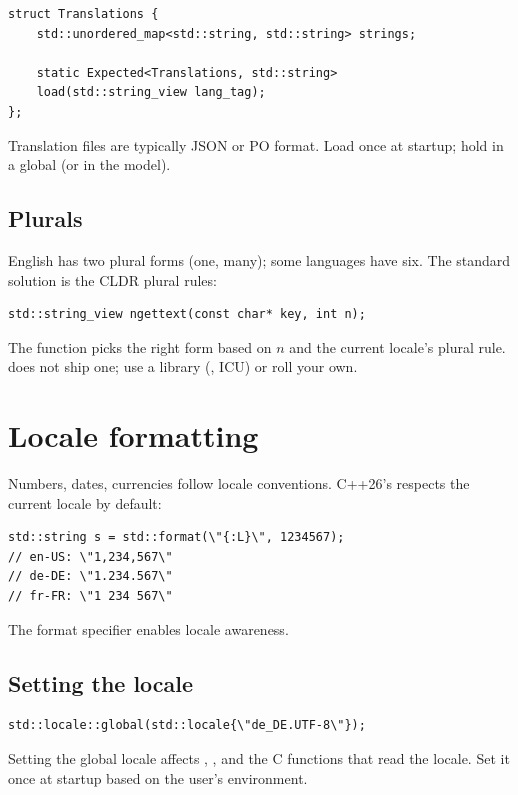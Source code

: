 \begin{lstlisting}
struct Translations {
    std::unordered_map<std::string, std::string> strings;

    static Expected<Translations, std::string>
    load(std::string_view lang_tag);
};
\end{lstlisting}

Translation files are typically JSON or PO format. Load once at
startup; hold in a global (or in the model).

\subsection*{Plurals}

English has two plural forms (one, many); some languages have
six. The standard solution is the CLDR plural rules:

\begin{lstlisting}
std::string_view ngettext(const char* key, int n);
\end{lstlisting}

The function picks the right form based on $n$ and the current
locale's plural rule. \maya{} does not ship one; use a library
(, ICU) or roll your own.

\section{Locale formatting}

Numbers, dates, currencies follow locale conventions. C++26's
 respects the current locale by default:

\begin{lstlisting}
std::string s = std::format(\"{:L}\", 1234567);
// en-US: \"1,234,567\"
// de-DE: \"1.234.567\"
// fr-FR: \"1 234 567\"
\end{lstlisting}

The  format specifier enables locale awareness.

\subsection*{Setting the locale}

\begin{lstlisting}
std::locale::global(std::locale{\"de_DE.UTF-8\"});
\end{lstlisting}

Setting the global locale affects , ,
and the C functions that read the locale. Set it once at
startup based on the user's environment.

